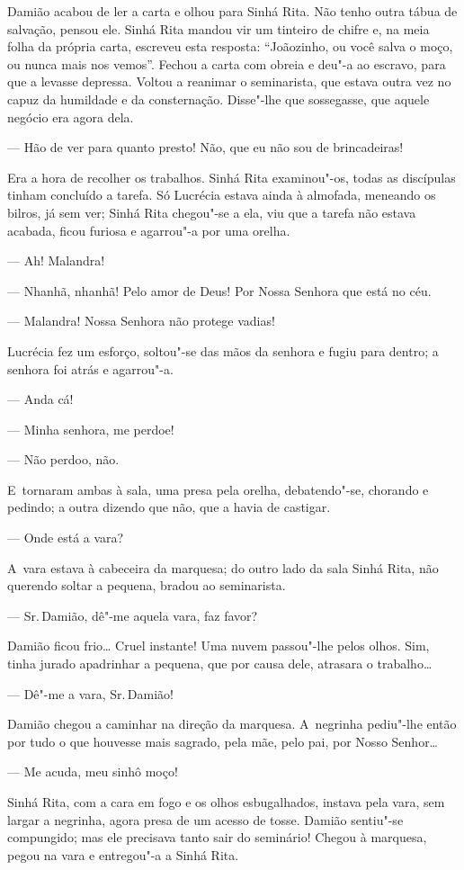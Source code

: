 \begin{linenumbers}
Damião acabou de ler a carta e olhou para Sinhá Rita. Não tenho outra
tábua de salvação, pensou ele. Sinhá Rita mandou vir um tinteiro de
chifre e, na meia folha da própria carta, escreveu esta resposta:
``Joãozinho, ou você salva o moço, ou nunca mais nos vemos''. Fechou a
carta com obreia e deu"-a ao escravo, para que a levasse depressa. Voltou
a reanimar o seminarista, que estava outra vez no capuz da humildade e
da consternação. Disse"-lhe que sossegasse, que aquele negócio era agora
dela.

--- Hão de ver para quanto presto! Não, que eu não sou de brincadeiras!

Era a hora de recolher os trabalhos. Sinhá Rita examinou"-os, todas as
discípulas tinham concluído a tarefa. Só Lucrécia estava ainda à
almofada, meneando os bilros, já sem ver; Sinhá Rita chegou"-se a ela,
viu que a tarefa não estava acabada, ficou furiosa e agarrou"-a por uma
orelha.

--- Ah! Malandra!

--- Nhanhã, nhanhã! Pelo amor de Deus! Por Nossa Senhora que está no céu.

--- Malandra! Nossa Senhora não protege vadias!

Lucrécia fez um esforço, soltou"-se das mãos da senhora e fugiu para
dentro; a senhora foi atrás e agarrou"-a.

--- Anda cá!

--- Minha senhora, me perdoe!

--- Não perdoo, não.

E~tornaram ambas à sala, uma presa pela orelha, debatendo"-se, chorando e
pedindo; a outra dizendo que não, que a havia de castigar.

--- Onde está a vara?

A~vara estava à cabeceira da marquesa; do outro lado da sala Sinhá Rita,
não querendo soltar a pequena, bradou ao seminarista.

--- Sr.\,Damião, dê"-me aquela vara, faz favor?

Damião ficou frio\ldots{} Cruel instante! Uma nuvem passou"-lhe pelos olhos.
Sim, tinha jurado apadrinhar a pequena, que por causa dele, atrasara o
trabalho\ldots{}

--- Dê"-me a vara, Sr.\,Damião!

Damião chegou a caminhar na direção da marquesa. A~negrinha pediu"-lhe
então por tudo o que houvesse mais sagrado, pela mãe, pelo pai, por
Nosso Senhor\ldots{}

--- Me acuda, meu sinhô moço!

Sinhá Rita, com a cara em fogo e os olhos esbugalhados, instava pela
vara, sem largar a negrinha, agora presa de um acesso de tosse. Damião
sentiu"-se compungido; mas ele precisava tanto sair do seminário! Chegou
à marquesa, pegou na vara e entregou"-a a Sinhá Rita.

\end{linenumbers}

